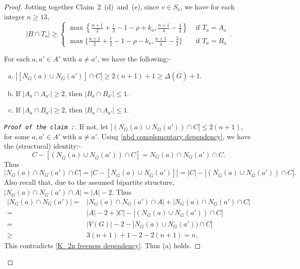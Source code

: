 \documentclass[reqno,10pt]{amsart}
\theoremstyle{definition}
\begin{document}
\begin{proof}
Jotting together Claim~2~(d)~and~(e),  since  $v\in S_{a}$, we have for each integer $n\geq13$,  
\begin{equation*}
|B\cap T_{a} |\geq\begin{cases}
		\max \left\{\frac{n+1}{2}+\frac{t}{2}-1-\rho+k_{a}, \frac{n+1}{4}-\frac{3}{2}\right\}&\text{ if } T_{a}=A_{a}\\
		\max \{\frac{n+1}{2}+\frac{t}{2}-1-\rho-k_{a}, \frac{n+1}{4}-\frac{3}{2}\}&\text{ if } T_{a}=B_{a}
	\end{cases}.
\end{equation*}



  For each $a,a'\in A'$ with $a\neq a'$, we have the following:-
\begin{enumerate}[(a)]
\item $|[N_{\overline{G}}(a)\cup N_{\overline{G}}(a')]\cap C|\geq 2(n+1)+1\geq\Delta(\overline{G})+1$.
\item If $|A_{a}\cap A_{a'}|\geq 2$,  then  $|B_{a}\cap B_{a'}|\leq 1$. 
\item If  $|A_{a}\cap B_{a'}|\geq 2$, then  $|B_{a}\cap A_{a'}|\leq 1$.
\end{enumerate}
\begin{proof}[\tt{Proof of the claim} :]\renewcommand{\qedsymbol}{}
If not, let $|(N_{\overline{G}}(a)\cup N_{\overline{G}}(a'))\cap C|\leq 2(n+1)$, for some $a,a'\in A'$ with $a\neq a'$. Using \eqref{nbd complementary dependency}, we have the (structural) identity:-
\begin{equation*}
	C-[(N_{\overline{G}}(a)\cup N_{\overline{G}}(a'))\cap C]=N_{G}(a)\cap N_{G}(a')\cap C.  
\end{equation*}
Thus 
\begin{equation*}
	|N_{G}(a)\cap N_{G}(a')\cap C |=|C-[N_{\overline{G}}(a)\cup N_{\overline{G}}(a')]|=|C|-|(N_{\overline{G}}(a)\cup N_{\overline{G}}(a'))\cap C|.
\end{equation*}
Also recall that, due to the assumed bipartite structure, $|N_{G}(a)\cap N_{G}(a')\cap A|=|A|-2$. Thus 
\begin{align*}
	|N_{G}(a)\cap N_{G}(a')|=&|N_{G}(a)\cap N_{G}(a')\cap A|+|N_{G}(a)\cap N_{G}(a')\cap C|\\
	=&|A|-2+|C|-|(N_{\overline{G}}(a)\cup N_{\overline{G}}(a'))\cap C|\\
	=&|V(G)|-2-|N_{\overline{G}}(a)\cup N_{\overline{G}}(a'))\cap C|\\
	\geq&3(n+1)+1-2-2(n+1)=n,  
\end{align*}
This contradicts \eqref{K_2n freeness dependency}. Thus (a) holds. 


\end{proof}
\end{proof}
\end{document}
